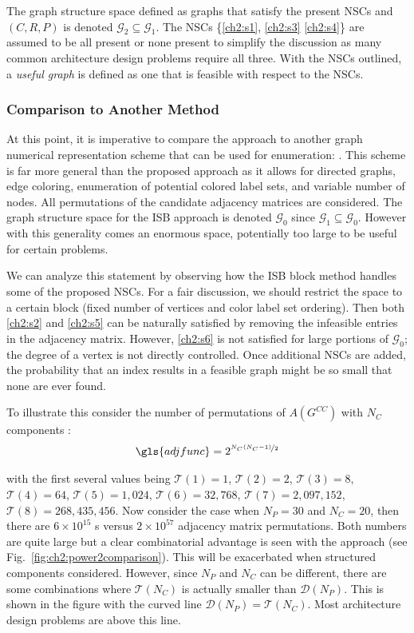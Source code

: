 The graph structure space defined as graphs that satisfy the present NSCs and $(C,R,P)$ is denoted $\mathcal{G}_2 \subseteq \mathcal{G}_1$. The NSCs \{\ref{ch2:s1}, \ref{ch2:s3} \ref{ch2:s4}\} are assumed to be all present or none present to simplify the discussion as many common architecture design problems require all three. With the NSCs outlined, a \textit{useful graph} is defined as one that is feasible with respect to the NSCs.

\subsubsection{Comparison to Another Method\label{sec:ch2:comparison}}

At this point, it is imperative to compare the \mypm{} approach to another graph numerical representation scheme that can be used for enumeration:  \cite{Wyatt2014a}. This scheme is far more general than the proposed  \mypm{} approach as it allows for directed graphs, edge coloring, enumeration of potential colored label sets, and variable number of nodes. All permutations of the candidate adjacency matrices are considered. The graph structure space for the ISB approach is denoted $\mathcal{G}_0$ since $\mathcal{G}_1 \subseteq \mathcal{G}_0$. However with this generality comes an enormous space, potentially too large to be useful for certain problems. 

We can analyze this statement by observing how the ISB block method handles some of the proposed NSCs. For a fair discussion, we should restrict the space to a certain block (fixed number of vertices and color label set ordering). Then both \ref{ch2:s2} and \ref{ch2:s5} can be naturally satisfied by removing the infeasible entries in the adjacency matrix. However, \ref{ch2:s6} is not satisfied for large portions of $\mathcal{G}_0$; the degree of a vertex is not directly controlled. Once additional NSCs are added, the probability that an index results in a feasible graph might be so small that none are ever found. 

\indent To illustrate this consider the number of permutations of $A(G^{CC})$ with $N_C$ components \cite{Wyatt2014a}:
\begin{align}
\gls{adjfunc} = 2^{\nicefrac{N_C (N_C - 1)}{2}}
\end{align}

\noindent with the first several values being $\mathcal{T}(1) = 1$, $\mathcal{T}(2) = 2$, $\mathcal{T}(3) = 8$, $\mathcal{T}(4) = 64$, $\mathcal{T}(5) = 1,024$, $\mathcal{T}(6) = 32,768$, $\mathcal{T}(7) = 2,097,152$, $\mathcal{T}(8) = 268,435,456$. Now consider the case when $N_P = 30$ and $N_C = 20$, then there are $6\times 10^{15}$ \mypm{}s versus $2\times 10^{57}$ adjacency matrix permutations. Both numbers are quite large but a clear combinatorial advantage is seen with the \mypm{} approach (see Fig.~\ref{fig:ch2:power2comparison}). This will be exacerbated when structured components considered.  However, since $N_P$ and $N_C$ can be different, there are some combinations where $\mathcal{T}(N_C)$ is actually smaller than $\mathcal{D}(N_P)$. This is shown in the figure with the curved line $\mathcal{D}(N_P) = \mathcal{T}(N_C)$. Most architecture design problems are above this line.

